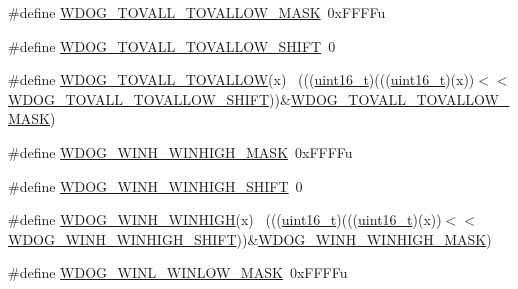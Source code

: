 \begin{DoxyCompactItemize}
\item 
\#define \hyperlink{group___w_d_o_g___register___masks_ga71c3913b6be99b211a3c3031caf8ac66}{W\+D\+O\+G\+\_\+\+T\+O\+V\+A\+L\+L\+\_\+\+T\+O\+V\+A\+L\+L\+O\+W\+\_\+\+M\+A\+SK}~0x\+F\+F\+F\+Fu
\item 
\#define \hyperlink{group___w_d_o_g___register___masks_ga57ba2617b2855cd4b3d1eb0b3c878f52}{W\+D\+O\+G\+\_\+\+T\+O\+V\+A\+L\+L\+\_\+\+T\+O\+V\+A\+L\+L\+O\+W\+\_\+\+S\+H\+I\+FT}~0
\item 
\#define \hyperlink{group___w_d_o_g___register___masks_ga27f719a1e0f5bcf436739997e10499db}{W\+D\+O\+G\+\_\+\+T\+O\+V\+A\+L\+L\+\_\+\+T\+O\+V\+A\+L\+L\+OW}(x)                                ~(((\hyperlink{_p_e___types_8h_a1f1825b69244eb3ad2c7165ddc99c956}{uint16\+\_\+t})(((\hyperlink{_p_e___types_8h_a1f1825b69244eb3ad2c7165ddc99c956}{uint16\+\_\+t})(x))$<$$<$\hyperlink{group___w_d_o_g___register___masks_ga57ba2617b2855cd4b3d1eb0b3c878f52}{W\+D\+O\+G\+\_\+\+T\+O\+V\+A\+L\+L\+\_\+\+T\+O\+V\+A\+L\+L\+O\+W\+\_\+\+S\+H\+I\+FT}))\&\hyperlink{group___w_d_o_g___register___masks_ga71c3913b6be99b211a3c3031caf8ac66}{W\+D\+O\+G\+\_\+\+T\+O\+V\+A\+L\+L\+\_\+\+T\+O\+V\+A\+L\+L\+O\+W\+\_\+\+M\+A\+SK})
\item 
\#define \hyperlink{group___w_d_o_g___register___masks_ga6efef6fddbc8b8600a8dee5a24659068}{W\+D\+O\+G\+\_\+\+W\+I\+N\+H\+\_\+\+W\+I\+N\+H\+I\+G\+H\+\_\+\+M\+A\+SK}~0x\+F\+F\+F\+Fu
\item 
\#define \hyperlink{group___w_d_o_g___register___masks_ga362e7a13b632027b940135991c9d169b}{W\+D\+O\+G\+\_\+\+W\+I\+N\+H\+\_\+\+W\+I\+N\+H\+I\+G\+H\+\_\+\+S\+H\+I\+FT}~0
\item 
\#define \hyperlink{group___w_d_o_g___register___masks_gaf361b5b26d7ba7d6aa8491bdb494f4ac}{W\+D\+O\+G\+\_\+\+W\+I\+N\+H\+\_\+\+W\+I\+N\+H\+I\+GH}(x)                                      ~(((\hyperlink{_p_e___types_8h_a1f1825b69244eb3ad2c7165ddc99c956}{uint16\+\_\+t})(((\hyperlink{_p_e___types_8h_a1f1825b69244eb3ad2c7165ddc99c956}{uint16\+\_\+t})(x))$<$$<$\hyperlink{group___w_d_o_g___register___masks_ga362e7a13b632027b940135991c9d169b}{W\+D\+O\+G\+\_\+\+W\+I\+N\+H\+\_\+\+W\+I\+N\+H\+I\+G\+H\+\_\+\+S\+H\+I\+FT}))\&\hyperlink{group___w_d_o_g___register___masks_ga6efef6fddbc8b8600a8dee5a24659068}{W\+D\+O\+G\+\_\+\+W\+I\+N\+H\+\_\+\+W\+I\+N\+H\+I\+G\+H\+\_\+\+M\+A\+SK})
\item 
\#define \hyperlink{group___w_d_o_g___register___masks_gadc36bfdccd5e9c14d063a5b36b6a3f6a}{W\+D\+O\+G\+\_\+\+W\+I\+N\+L\+\_\+\+W\+I\+N\+L\+O\+W\+\_\+\+M\+A\+SK}~0x\+F\+F\+F\+Fu
\item 

\end{DoxyCompactItemize}
